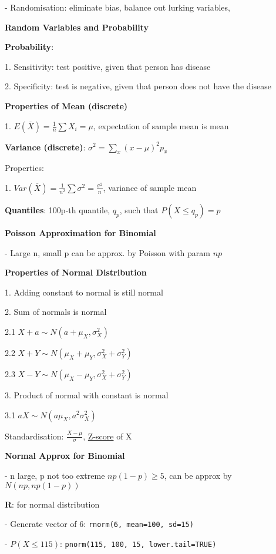 \documentclass[10pt, a4paper]{article}
\newcommand{\header}[1]{{\normalsize\textbf{#1}}}
\newcommand{\tab}[0]{\hspace*{2mm}}
\begin{document}
\begin{multicols*}{3}
		- Randomisation: eliminate bias, balance out lurking variables, 

		\header{Random Variables and Probability}

		\textbf{Probability}:

		1. Sensitivity: test positive, given that person has disease

		2. Specificity: test is negative, given that person does not have the disease

		\textbf{Properties of Mean (discrete)}

		1. $E(\overline{X}) = \frac{1}{n}\sum X_i = \mu$, expectation of sample mean is mean

		\textbf{Variance (discrete)}: $\sigma^2 = \sum_x (x - \mu)^2 p_x$

		Properties: 
		
		1. $Var(\overline{X}) = \frac{1}{n^2} \sum \sigma^2 = \frac{\sigma^2}{n}$, variance of sample mean

		\textbf{Quantiles}: 100p-th quantile, $q_p$, such that $P(X \leq q_p) = p$

		\textbf{Poisson Approximation for Binomial}

		- Large n, small p can be approx. by Poisson with param $np$

		\textbf{Properties of Normal Distribution}

		1. Adding constant to normal is still normal

		2. Sum of normals is normal

		\tab{} 2.1 $X + a \sim N(a + \mu_X, \sigma_X^2)$
		
		\tab{} 2.2 $X + Y \sim N(\mu_X + \mu_Y, \sigma_X^2 + \sigma_Y^2)$

		\tab{} 2.3 $X - Y \sim N(\mu_X - \mu_Y, \sigma_X^2 + \sigma_Y^2)$

		3. Product of normal with constant is normal

		\tab{} 3.1 $aX \sim N(a\mu_X, a^2\sigma^2_X)$

		Standardisation: $\frac{X - \mu}{\sigma}$, \underline{Z-score} of X

		\textbf{Normal Approx for Binomial}

		- n large, p not too extreme $np(1-p) \geq 5$, can be approx by $N(np, np(1-p))$

		\textbf{R}: for normal distribution

		- Generate vector of 6: \texttt{rnorm(6, mean=100, sd=15)}

		- $P(X \leq 115)$: \texttt{pnorm(115, 100, 15, lower.tail=TRUE)}


\end{multicols*}
\end{document}
